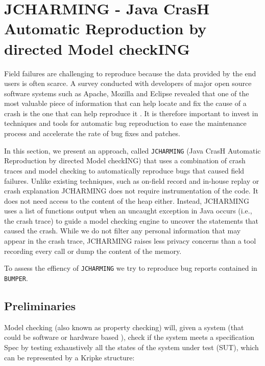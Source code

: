 
\section{JCHARMING - Java CrasH Automatic Reproduction by directed Model checkING\label{sec:JCHARMING}}

Field failures are challenging to reproduce because
the data provided by the end users is often scarce. A survey
conducted with developers of major open source software
systems such as Apache, Mozilla and Eclipse revealed that
one of the most valuable piece of information that can help
locate and fix the cause of a crash is the one that can help
reproduce it \cite{Bettenburg2008}. It is therefore important to invest in
techniques and tools for automatic bug reproduction to ease
the maintenance process and accelerate the rate of bug fixes
and patches.

In this section, we present an approach, called {\tt JCHARMING}
(Java CrasH Automatic Reproduction by directed Model
checkING) that uses a combination of crash traces and model
checking to automatically reproduce bugs that caused field
failures. Unlike existing techniques, such as on-field record and in-house replay \cite{Narayanasamy2005,Artzi2008,Jaygarl} or crash explanation \cite{Manevich2004,chandra2009snugglebug} JCHARMING does not
require instrumentation of the code. It does not need access to
the content of the heap either. Instead, JCHARMING uses a
list of functions output when an uncaught exception in Java
occurs (i.e., the crash trace) to guide a model checking engine
to uncover the statements that caused the crash. While we do not filter any personal information that may appear in the crash trace, JCHARMING  raises less privacy concerns than a tool recording every call or dump the content of the memory.

To assess the effiency of {\tt JCHARMING} we try to reproduce bug reports contained in {\tt BUMPER}.

\subsection{Preliminaries}

Model checking (also known as property checking) will, given a system (that could be software \cite{Visser2003} or hardware based \cite{kropf1999introduction}), check if the system meets a specification Spec by testing exhaustively all the states of the system under test (SUT), which can be represented by a Kripke \cite{Kripke1963} structure:

